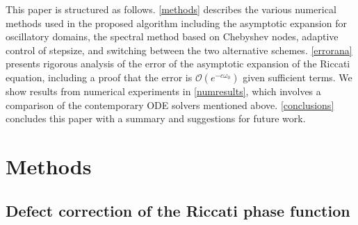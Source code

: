 \documentclass[10pt]{article}
\newcommand{\bigO}{{\mathcal O}}
\newcommand{\om}{\omega}
\begin{document}
This paper is structured as follows. \cref{methods} describes the various
numerical methods used in the proposed algorithm including the asymptotic
expansion for oscillatory domains, the spectral method based on Chebyshev
nodes, adaptive control of stepsize, and switching between the two alternative
schemes.
\cref{errorana} presents rigorous analysis of the error of
the asymptotic expansion of the Riccati equation,
including a proof that the error is $\bigO(e^{-c\om_0})$ given sufficient terms.
We show results from numerical experiments in
\cref{numresults}, which involves a comparison of the contemporary ODE solvers
mentioned above. \cref{conclusions} concludes this paper with a summary and
suggestions for future work.




\section{Methods \label{methods}}

\subsection{Defect correction of the Riccati phase function}
  \label{phasefun}
\end{document}

